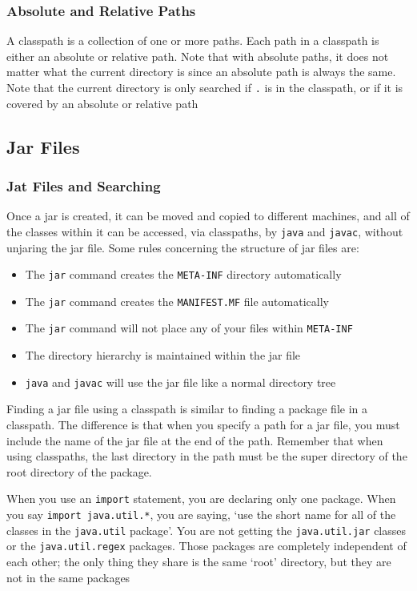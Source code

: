 \subsubsection{Absolute and Relative Paths}
A classpath is a collection of one or more paths. Each path in a classpath is 
either an absolute or relative path. Note that with absolute paths, it does not 
matter what the current directory is since an absolute path is always the same.
Note that the current directory is only searched if \verb#.# is in the 
classpath, or if it is covered by an absolute or relative path

\subsection{Jar Files}
\subsubsection{Jat Files and Searching}
Once a jar is created, it can be moved and copied to different machines, and 
all of the classes within it can be accessed, via classpaths, by \verb#java# 
and \verb#javac#, without unjaring the jar file. Some rules concerning the 
structure of jar files are:
\begin{itemize}
    \item The \verb#jar# command creates the \verb#META-INF# directory 
    automatically
    \item The \verb#jar# command creates the \verb#MANIFEST.MF# file 
    automatically
    \item The \verb#jar# command will not place any of your files within 
    \verb#META-INF#
    \item The directory hierarchy is maintained within the jar file
    \item \verb#java# and \verb#javac# will use the jar file like a normal 
    directory tree
\end{itemize}
Finding a jar file using a classpath is similar to finding a package file in a 
classpath. The difference is that when you specify a path for a jar file, you 
must include the name of the jar file at the end of the path. Remember that 
when using classpaths, the last directory in the path must be the super 
directory of the root directory of the package.

When you use an \verb#import# statement, you are declaring only one package.  
When you say \verb#import java.util.*#, you are saying, `use the short name for 
all of the classes in the \verb#java.util# package'. You are not getting the 
\verb#java.util.jar# classes or the \verb#java.util.regex# packages. Those 
packages are completely independent of each other; the only thing they share is 
the same `root' directory, but they are not in the same packages

